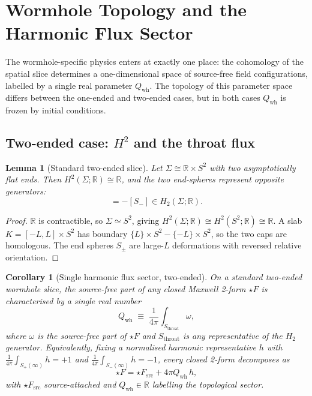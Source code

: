 \documentclass[aps,prd,onecolumn,nofootinbib,superscriptaddress]{revtex4-2}
\newtheorem{lemma}{Lemma}
\newtheorem{corollary}{Corollary}
\begin{document}
\section{Wormhole Topology and the Harmonic Flux Sector}
\label{sec:topology}

The wormhole-specific physics enters at exactly one place: the cohomology of
the spatial slice determines a one-dimensional space of source-free field
configurations, labelled by a single real parameter $Q_{\mathrm{wh}}$.  The
topology of this parameter space differs between the one-ended and two-ended
cases, but in both cases $Q_{\mathrm{wh}}$ is frozen by initial conditions.

\subsection{Two-ended case: \texorpdfstring{$H^2$}{H2} and the throat flux}

\begin{lemma}[Standard two-ended slice]
\label{lem:standard-topology}
Let $\Sigma\cong\mathbb{R}\times S^2$ with two asymptotically flat ends.  Then
$H^2(\Sigma;\mathbb{R})\cong\mathbb{R}$, and the two end-spheres represent
opposite generators:
\begin{equation}
  [S_+] = -[S_-]\in H_2(\Sigma;\mathbb{R}).
\end{equation}
\end{lemma}

\begin{proof}
$\mathbb{R}$ is contractible, so $\Sigma\simeq S^2$, giving
$H^2(\Sigma;\mathbb{R})\cong H^2(S^2;\mathbb{R})\cong\mathbb{R}$.  A slab
$K=[-L,L]\times S^2$ has boundary $\{L\}\times S^2 - \{-L\}\times S^2$, so
the two caps are homologous.  The end spheres $S_\pm$ are large-$L$ deformations
with reversed relative orientation.
\end{proof}

\begin{corollary}[Single harmonic flux sector, two-ended]
\label{cor:single-sector-2e}
On a standard two-ended wormhole slice, the source-free part of any closed
Maxwell 2-form $\star F$ is characterised by a single real number
\begin{equation}
  Q_{\mathrm{wh}} \;\equiv\; \frac{1}{4\pi}\int_{S_{\mathrm{throat}}}\omega,
\end{equation}
where $\omega$ is the source-free part of $\star F$ and $S_{\mathrm{throat}}$
is any representative of the $H_2$ generator.  Equivalently, fixing a normalised
harmonic representative $h$ with $\frac{1}{4\pi}\int_{S_+(\infty)}h=+1$ and
$\frac{1}{4\pi}\int_{S_-(\infty)}h=-1$, every closed 2-form decomposes as
\begin{equation}
  \star F = \star F_{\mathrm{src}} + 4\pi Q_{\mathrm{wh}}\,h,
\end{equation}
with $\star F_{\mathrm{src}}$ source-attached and $Q_{\mathrm{wh}}\in\mathbb{R}$
labelling the topological sector.
\end{corollary}
\end{document}
